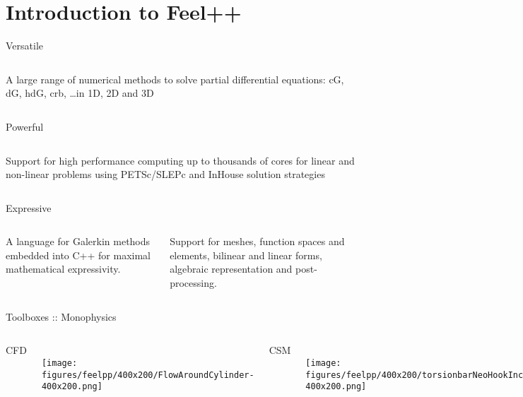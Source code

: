 \section{Introduction to Feel++}

\begin{frame}{Versatile}

  \begin{columns}[c]
    A large range of \alert{numerical methods} to solve partial differential
    equations: cG, dG, hdG, crb, \ldots in 1D, 2D and 3D
  \end{columns}
\end{frame}

\begin{frame}{Powerful}

  \begin{columns}[c]
    Support for \alert{high performance computing} up to thousands of cores
    for linear and non-linear problems using  \alert{PETSc/SLEPc} and
    \alert{InHouse} solution strategies
    \centerline{}
  \end{columns}
\end{frame}

\begin{frame}{Expressive}

  \begin{columns}[c]

        \centerline{}

    A language for \alert{Galerkin methods} embedded into C++ for
    maximal mathematical \alert{expressivity}.

    Support for meshes, function
    spaces and elements, bilinear and linear forms, algebraic
    representation and post-processing.
  \end{columns}
\end{frame}

\begin{frame}{Toolboxes :: Monophysics}
  \begin{columns}[c]
    \centerline{ \Large CFD}\\[.5cm]
    \texttt{[image: figures/feelpp/400x200/FlowAroundCylinder-400x200.png]}
    \centerline{ \Large CSM}\\[.5cm]
    \texttt{[image: figures/feelpp/400x200/torsionbarNeoHookIncompT2-400x200.png]}
    \centerline{\Large Heat Transfer}\\[.5cm]
    \texttt{[image: figures/feelpp/400x200/heat-transfer-building-400x200.png]}
  \end{columns}
\end{frame}

